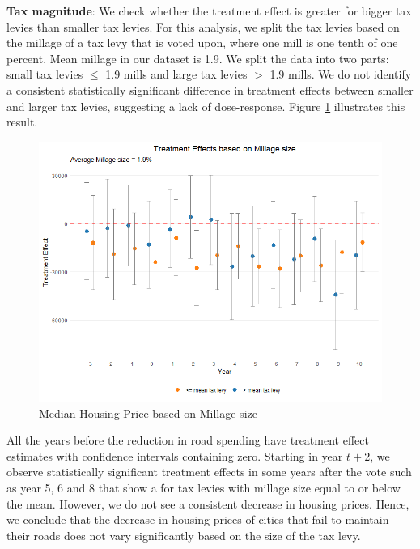 \vskip 1cm

\textbf{Tax magnitude}: We check whether the treatment effect is greater for bigger tax levies than smaller tax levies. For this analysis, we split the tax levies based on the millage of a tax levy that is voted upon, where one mill is one tenth of one percent. Mean millage in our dataset is 1.9. We split the data into two parts: small tax levies $\le$ 1.9 mills and large tax levies $>$ 1.9 mills. We do not identify a consistent statistically significant difference in treatment effects between smaller and larger tax levies, suggesting a lack of dose-response. Figure \ref{fig:tes_covs_size} illustrates this result.

\begin{figure}[htbp]
    \centering
    \includegraphics[width=\textwidth,keepaspectratio]{images/tes_size.png}
    \caption{Median Housing Price based on Millage size}
    \label{fig:tes_covs_size}
\end{figure}

All the years before the reduction in road spending have treatment effect estimates with confidence intervals containing zero. Starting in year $t+2$, we observe statistically significant treatment effects in some years after the vote such as year 5, 6 and 8 that show a for tax levies with millage size equal to or below the mean. However, we do not see a consistent decrease in housing prices. Hence, we conclude that the decrease in housing prices of cities that fail to maintain their roads does not vary significantly based on the size of the tax levy.

\vskip 1cm

